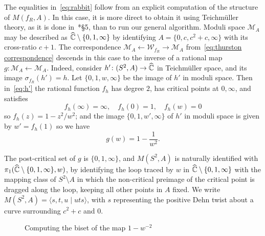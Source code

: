 \documentclass{amsart}
\newcommand\lasso[5][]{
  \coordinate (source) at #2;
  \coordinate (goal) at #4;
  \coordinate (x0) at ($(goal)!2*#3!(source)$);
  \coordinate (x1) at ($(goal)!#3!45:(source)$);
  \coordinate (x2) at ($(goal)!#3!-45:(source)$);

  \draw[#1] let \p1=($(x1)-(goal)$), \p2=($(x2)-(goal)$),
        \n1={atan2(\y1,\x1)}, \n2={atan2(\y2,\x2)}, \n3={\n2>\n1?\n2:\n2+360}
    in #2 -- #5 (x0) .. controls +($0.5*(goal)-0.5*(x0)$) and +($0.5*(\p2)$) .. (x1) arc (\n1:\n3:#3)
  .. controls +($0.5*(\p1)$) and +($0.5*(goal)-0.5*(x0)$) .. (x0);
 \draw[->,dash pattern=on 0pt off #3]  ($(goal)!1.414*#3!135:(source)$) -- ($(goal)!-#3!(source)$);
}
\begin{document}
The equalities in~\eqref{eq:rabbit} follow from an explicit
computation of the structure of $M(f_R,A)$. In this case, it is more
direct to obtain it using Teichm\"uller theory, as it is done
in~\cite{bartholdi-n:thurston}*{\S5}, than to run our general
algorithm.  Moduli space $\mathscr M_A$ may be described as
${\widehat{{\mathbb C}}}\setminus\{0,1,\infty\}$ by identifying $A=\{0,c,c^2+c,\infty\}$
with its cross-ratio $c+1$. The correspondence
$\mathscr M_A\leftarrow\mathscr W_{f_R}\to\mathscr M_A$
from~\eqref{eq:thurston correspondence} descends in this case to the
inverse of a rational map $g\colon\mathscr M_A\leftarrow\mathscr
M_A$. Indeed, consider $h'\colon(S^2,A)\to{\widehat{{\mathbb C}}}$ in Teichm\"uller space,
and its image $\sigma_{f_R}(h')=h$. Let $\{0,1,w,\infty\}$ be the
image of $h'$ in moduli space. Then in~\eqref{eq:h'} the rational
function $f_h$ has degree $2$, has critical points at $0,\infty$, and
satisfies
\[f_h(\infty)=\infty,\quad f_h(0)=1,\quad f_h(w)=0
\]
so $f_h(z)=1-z^2/w^2$; and the image $\{0,1,w',\infty\}$ of $h'$ in
moduli space is given by $w'=f_h(1)$ so we have
\[g(w)=1-\frac1{w^2}.\]

The post-critical set of $g$ is $\{0,1,\infty\}$, and $M(S^2,A)$ is
naturally identified with $\pi_1({\widehat{{\mathbb C}}}\setminus\{0,1,\infty\},w)$, by
identifying the loop traced by $w$ in ${\widehat{{\mathbb C}}}\setminus\{0,1,\infty\}$
with the mapping class of $S^2\setminus A$ in which the non-critical
preimage of the critical point is dragged along the loop, keeping all
other points in $A$ fixed. We write
$M(S^2,A)=\langle s,t,u\mid u t s\rangle$, with $s$ representing
the positive Dehn twist about a curve surrounding $c^2+c$ and $0$.

\begin{figure}
  \begin{center}\end{center}
  \caption{Computing the biset of the map $1-w^{-2}$}\label{fig:bnmap}
\end{figure}
\end{document}
